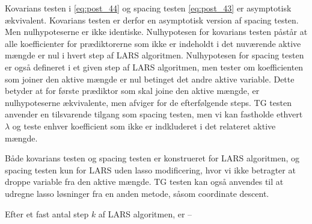 Kovarians testen i \eqref{eq:post_44} og spacing testen \eqref{eq:post_43} er asymptotisk ækvivalent.
Kovarians testen er derfor en asymptotisk version af spacing testen.
Men nulhypoteserne er ikke identiske.
Nulhypotesen for kovarians testen påstår at alle koefficienter for prædiktorerne som ikke er indeholdt i det nuværende aktive mængde er nul i hvert step af LARS algoritmen.
Nulhypotesen for spacing testen er også defineret i et given step af LARS algoritmen, men tester om koefficienten som joiner den aktive mængde er nul betinget det andre aktive variable.
Dette betyder at for første prædiktor som skal joine den aktive mængde, er nulhypoteserne ækvivalente, men afviger for de efterfølgende steps.
TG testen anvender en tilsvarende tilgang som spacing testen, men vi kan fastholde ethvert \(\lambda\) og teste enhver koefficient som ikke er indkluderet i det relateret aktive mængde.

Både kovarians testen og spacing testen er konstrueret for LARS algoritmen, og spacing testen kun for LARS uden lasso modificering, hvor vi ikke betragter at droppe variable fra den aktive mængde. TG testen kan også anvendes til at udregne lasso løsninger fra en anden metode, såsom coordinate descent.



\begin{thm}
Efter et fast antal step \(k\) af LARS algoritmen, er --
\end{thm}
